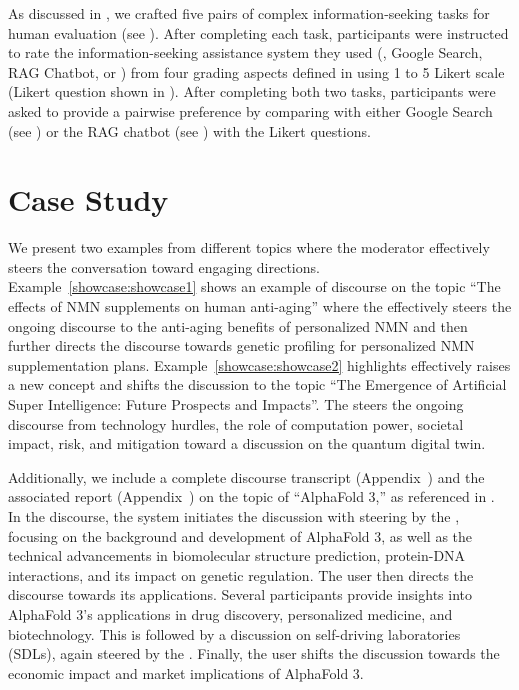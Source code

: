 \documentclass[11pt]{article}
\begin{document}
As discussed in , we crafted five pairs of complex information-seeking tasks for human evaluation (see ). After completing each task, participants were instructed to rate the information-seeking assistance system they used (\ie, Google Search, RAG Chatbot, or \system) from four grading aspects defined in  using 1 to 5 Likert scale (Likert question shown in ). After completing both two tasks, participants were asked to provide a pairwise preference by comparing \system with either Google Search (see ) or the RAG chatbot (see ) with the Likert questions.


\section{Case Study}
We present two examples from different topics where the moderator effectively steers the conversation toward engaging directions. Example~\ref{showcase:showcase1} shows an example of discourse on the topic ``The effects of NMN supplements on human anti-aging'' where the \moderator effectively steers the ongoing discourse to the anti-aging benefits of personalized NMN and then further directs the discourse towards genetic profiling for personalized NMN supplementation plans. Example~\ref{showcase:showcase2} highlights \moderator effectively raises a new concept and shifts the discussion to the topic ``The Emergence of Artificial Super Intelligence: Future Prospects and Impacts''. The \moderator steers the ongoing discourse from technology hurdles, the role of computation power, societal impact, risk, and mitigation toward a discussion on the quantum digital twin.

Additionally, we include a complete discourse transcript (Appendix~) and the associated report (Appendix~) on the topic of “AlphaFold 3,” as referenced in . In the discourse, the system initiates the discussion with steering by the \moderator, focusing on the background and development of AlphaFold 3, as well as the technical advancements in biomolecular structure prediction, protein-DNA interactions, and its impact on genetic regulation. The user then directs the discourse towards its applications. Several participants provide insights into AlphaFold 3’s applications in drug discovery, personalized medicine, and biotechnology. This is followed by a discussion on self-driving laboratories (SDLs), again steered by the \moderator. Finally, the user shifts the discussion towards the economic impact and market implications of AlphaFold 3.
\end{document}
